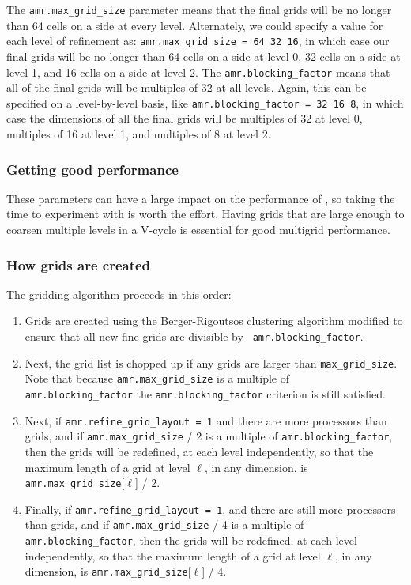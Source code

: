 The {\tt amr.max\_grid\_size} parameter means that the final grids
will be no longer than 64 cells on a side at every level.
Alternately, we could specify a value for each level of refinement as:
{\tt amr.max\_grid\_size = 64 32 16}, in which case our final grids
will be no longer than 64 cells on a side at level 0, 32 cells on a
side at level 1, and 16 cells on a side at level 2.  The {\tt amr.blocking\_factor}
means that all of the final grids will be multiples of 32 at all levels.
Again, this can be specified on a level-by-level basis, like
{\tt amr.blocking\_factor = 32 16 8}, in which case the 
dimensions of all the final grids will be multiples of 32
at level 0, multiples of 16 at level 1, and multiples of 8 at level 2.

\subsubsection{Getting good performance}

These parameters can have a large impact on the performance
of \pelelm, so taking the time to experiment with is worth the effort.
Having grids that are large enough to coarsen multiple levels in a
V-cycle is essential for good multigrid performance.

\subsubsection{How grids are created}

The gridding algorithm proceeds in this order:
\begin{enumerate}
\item Grids are created using the Berger-Rigoutsos clustering algorithm 
modified to ensure that all new fine grids are divisible by {\tt
amr.blocking\_factor}.

\item Next, the grid list is chopped up if any grids are larger than {\tt max\_grid\_size}.
Note that because {\tt amr.max\_grid\_size} is a multiple of {\tt
amr.blocking\_factor} the {\tt amr.blocking\_factor} criterion is
still satisfied.

\item Next, if {\tt amr.refine\_grid\_layout = 1} and there are more processors than grids, and
if {\tt amr.max\_grid\_size} / 2 is a multiple of {\tt amr.blocking\_factor},
then the grids will be redefined, at each level independently, so that
the maximum length of a grid at level $\ell$, in any dimension, is
{\tt amr.max\_grid\_size}[$\ell$] / 2.

\item Finally, if {\tt amr.refine\_grid\_layout = 1},  and there are still more processors
than grids, and if {\tt amr.max\_grid\_size} / 4 is a multiple of {\tt
amr.blocking\_factor}, then the grids will be redefined, at each level
independently, so that the maximum length of a grid at level $\ell$,
in any dimension, is {\tt amr.max\_grid\_size}[$\ell$] / 4.
\end{enumerate}



